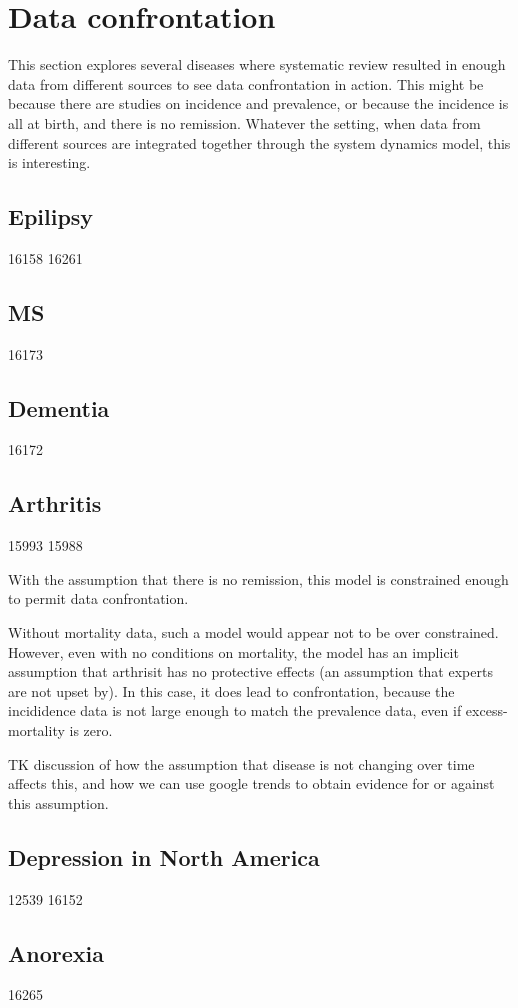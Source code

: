 \section{Data confrontation}
This section explores several diseases where systematic review
resulted in enough data from different sources to see data
confrontation in action.  This might be because there are studies on
incidence and prevalence, or because the incidence is all at birth,
and there is no remission.  Whatever the setting, when data from
different sources are integrated together through the system dynamics
model, this is interesting.

\subsection{Epilipsy}
16158
16261

\subsection{MS}
16173

\subsection{Dementia}
16172

\subsection{Arthritis}
15993
15988

With the assumption that there is no remission, this model is
constrained enough to permit data confrontation.

Without mortality data, such a model would appear not to be over
constrained.  However, even with no conditions on mortality, the model
has an implicit assumption that arthrisit has no protective effects
(an assumption that experts are not upset by).  In this case, it does
lead to confrontation, because the incididence data is not large
enough to match the prevalence data, even if excess-mortality is zero.

TK discussion of how the assumption that disease is not changing over
time affects this, and how we can use google trends to obtain evidence
for or against this assumption.


\subsection{Depression in North America}
12539 
16152


\subsection{Anorexia}
16265
